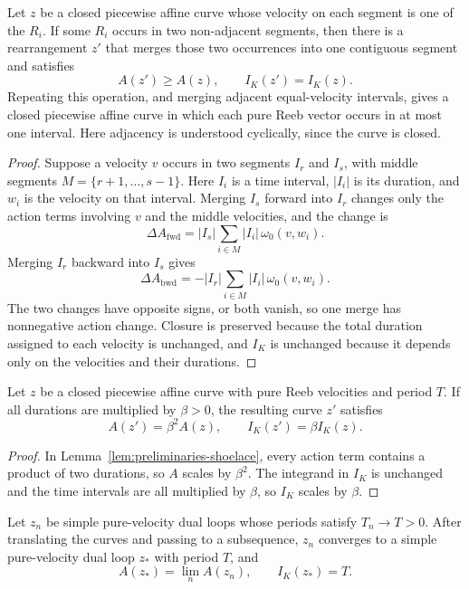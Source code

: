 \begin{lemma}\label{lem:generalized-reeb-merging}
Let \(z\) be a closed piecewise affine curve whose velocity on each segment is
one of the \(R_i\). If some \(R_i\) occurs in two non-adjacent segments, then
there is a rearrangement \(z'\) that merges those two occurrences into one
contiguous segment and satisfies
\[
  A(z')\geq A(z),
  \qquad
  I_K(z')=I_K(z).
\]
Repeating this operation, and merging adjacent equal-velocity intervals,
gives a closed piecewise affine curve in which each pure Reeb vector occurs in
at most one interval. Here adjacency is understood cyclically, since the curve
is closed.
\end{lemma}

\begin{proof}
Suppose a velocity \(v\) occurs in two segments \(I_r\) and \(I_s\), with
middle segments \(M=\{r+1,\ldots,s-1\}\). Here \(I_i\) is a time interval,
\(|I_i|\) is its duration, and \(w_i\) is the velocity on that interval.
Merging \(I_s\) forward into \(I_r\)
changes only the action terms involving \(v\) and the middle velocities, and
the change is
\[
  \Delta A_{\mathrm{fwd}}
  =
  |I_s|\sum_{i\in M}|I_i|\,\omega_0(v,w_i).
\]
Merging \(I_r\) backward into \(I_s\) gives
\[
  \Delta A_{\mathrm{bwd}}
  =
  -|I_r|\sum_{i\in M}|I_i|\,\omega_0(v,w_i).
\]
The two changes have opposite signs, or both vanish, so one merge has
nonnegative action change. Closure is preserved because the total duration assigned to each
velocity is unchanged, and \(I_K\) is unchanged because it
depends only on the velocities and their durations.
\end{proof}

\begin{lemma}[Rescaling]\label{lem:generalized-reeb-rescaling}
Let \(z\) be a closed piecewise affine curve with pure Reeb velocities and
period \(T\). If all durations are multiplied by \(\beta>0\), the resulting
curve \(z'\) satisfies
\[
  A(z')=\beta^2A(z),
  \qquad
  I_K(z')=\beta I_K(z).
\]
\end{lemma}

\begin{proof}
In Lemma~\ref{lem:preliminaries-shoelace}, every action term contains a
product of two durations, so \(A\) scales by \(\beta^2\). The integrand in
\(I_K\) is unchanged and the time intervals are all multiplied by \(\beta\), so
\(I_K\) scales by \(\beta\).
\end{proof}

\begin{lemma}\label{lem:generalized-reeb-compactness}
Let \(z_n\) be simple pure-velocity dual loops whose periods satisfy
\(T_n\to T>0\). After translating the curves and passing to a subsequence,
\(z_n\) converges to a simple pure-velocity dual loop \(z_*\) with period
\(T\), and
\[
  A(z_*)=\lim_n A(z_n),
  \qquad
  I_K(z_*)=T.
\]
\end{lemma}

